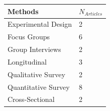 \documentclass[]{tufte-handout}
\begin{document}
\begin{longtable}[]{@{}ll@{}}
\toprule
\begin{minipage}[b]{0.29\columnwidth}\raggedright\strut
Methods\strut
\end{minipage} & \begin{minipage}[b]{0.21\columnwidth}\raggedright\strut
\(N_{Articles}\)\strut
\end{minipage}\tabularnewline
\midrule
\endhead
\begin{minipage}[t]{0.29\columnwidth}\raggedright\strut
Experimental Design\strut
\end{minipage} & \begin{minipage}[t]{0.21\columnwidth}\raggedright\strut
2\strut
\end{minipage}\tabularnewline
\begin{minipage}[t]{0.29\columnwidth}\raggedright\strut
Focus Groups\strut
\end{minipage} & \begin{minipage}[t]{0.21\columnwidth}\raggedright\strut
6\strut
\end{minipage}\tabularnewline
\begin{minipage}[t]{0.29\columnwidth}\raggedright\strut
Group Interviews\strut
\end{minipage} & \begin{minipage}[t]{0.21\columnwidth}\raggedright\strut
2\strut
\end{minipage}\tabularnewline
\begin{minipage}[t]{0.29\columnwidth}\raggedright\strut
Longitudinal\strut
\end{minipage} & \begin{minipage}[t]{0.21\columnwidth}\raggedright\strut
3\strut
\end{minipage}\tabularnewline
\begin{minipage}[t]{0.29\columnwidth}\raggedright\strut
Qualitative Survey\strut
\end{minipage} & \begin{minipage}[t]{0.21\columnwidth}\raggedright\strut
2\strut
\end{minipage}\tabularnewline
\begin{minipage}[t]{0.29\columnwidth}\raggedright\strut
Quantitative Survey\strut
\end{minipage} & \begin{minipage}[t]{0.21\columnwidth}\raggedright\strut
8\strut
\end{minipage}\tabularnewline
\begin{minipage}[t]{0.29\columnwidth}\raggedright\strut
Cross-Sectional\strut
\end{minipage} & \begin{minipage}[t]{0.21\columnwidth}\raggedright\strut
2\strut
\end{minipage}\tabularnewline
\bottomrule
\end{longtable}
\end{document}

